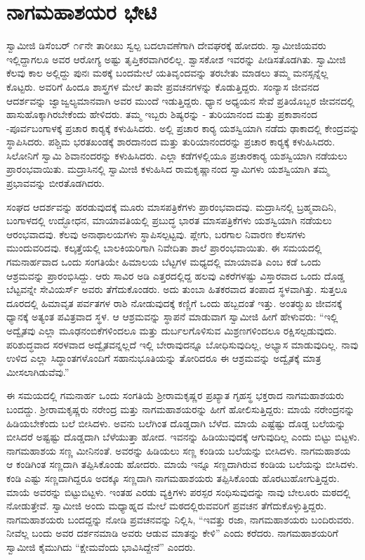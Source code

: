 
\chapter{ನಾಗಮಹಾಶಯರ ಭೇಟಿ }

 ಸ್ವಾಮೀಜಿ ಡಿಸೆಂಬರ್ ೧೯ನೇ ತಾರೀಖು ಸ್ವಲ್ಪ ಬದಲಾವಣೆಗಾಗಿ ದೇವಘರಕ್ಕೆ ಹೋದರು. ಸ್ವಾಮೀಜಿಯವರು ಇಲ್ಲಿದ್ದಾಗಲೂ ಅವರ ಆರೋಗ್ಯ ಅಷ್ಟು ತೃಪ್ತಿಕರವಾಗಿರಲಿಲ್ಲ. ಶ್ವಾಸಕೋಶ ಇವರನ್ನು ಪೀಡಿಸತೊಡಗಿತು. ಸ್ವಾಮೀಜಿ ಕೆಲವು ಕಾಲ ಅಲ್ಲಿದ್ದು ಪುನಃ ಮಠಕ್ಕೆ ಬಂದಮೇಲೆ ಯತಿವೃಂದವನ್ನು ತರಬೇತು ಮಾಡಲು ತಮ್ಮ ಮನಸ್ಸನ್ನೆಲ್ಲ ಕೊಟ್ಟರು. ಅವರಿಗೆ ಹಿಂದೂ ಶಾಸ್ತ್ರಗಳ ಮೇಲೆ ತಾವೇ ಪ್ರವಚನಗಳನ್ನು ಕೊಡುತ್ತಿದ್ದರು. ಸಂನ್ಯಾಸ ಜೀವನದ ಆದರ್ಶವನ್ನು ಜ್ವಾಜ್ವಲ್ಯಮಾನವಾಗಿ ಅವರ ಮುಂದೆ ಇಡುತ್ತಿದ್ದರು. ಧ್ಯಾನ ಅಧ್ಯಯನ ಸೇವೆ ಪ್ರತಿಯೊಬ್ಬರ ಜೀವನದಲ್ಲಿ ಹಾಸುಹೊಕ್ಕಾಗಿರಬೇಕೆಂದು ಹೇಳಿದರು. ತಮ್ಮ ಇಬ್ಬರು ಶಿಷ್ಯರನ್ನು - ತುರಿಯಾನಂದ ಮತ್ತು ಪ್ರಕಾಶಾನಂದ -ಪೂರ್ವಬಂಗಾಳಕ್ಕೆ ಪ್ರಚಾರ ಕಾರ‍್ಯಕ್ಕೆ ಕಳುಹಿಸಿದರು. ಅಲ್ಲಿ ಪ್ರಚಾರ ಕಾರ‍್ಯ ಯಶಸ್ವಿಯಾಗಿ ನಡೆದು ಢಾಕಾದಲ್ಲಿ ಕೇಂದ್ರವನ್ನು ಸ್ಥಾಪಿಸಿದರು. ಪಶ್ಚಿಮ ಭರತಖಂಡಕ್ಕೆ ಶಾರದಾನಂದ ಮತ್ತು ತುರಿಯಾನಂದರನ್ನು ಪ್ರಚಾರ ಕಾರ‍್ಯಕ್ಕೆ ಕಳುಹಿಸಿದರು. ಸಿಲೋನಿಗೆ ಸ್ವಾಮಿ ಶಿವಾನಂದರನ್ನು ಕಳುಹಿಸಿದರು. ಎಲ್ಲಾ ಕಡೆಗಳಲ್ಲಿಯೂ ಪ್ರಚಾರಕಾರ‍್ಯ ಯಶಸ್ವಿಯಾಗಿ ನಡೆಯಲು ಪ್ರಾರಂಭವಾಯಿತು. ಮದ್ರಾಸಿನಲ್ಲಿ ಸ್ವಾಮೀಜಿ ಕಳುಹಿಸಿದ ರಾಮಕೃಷ್ಣಾನಂದ ಸ್ವಾಮಿಗಳು ಯಶಸ್ವಿಯಾಗಿ ತಮ್ಮ ಪ್ರಭಾವವನ್ನು ಬೀರತೊಡಗಿದರು. 

 ಸಂಘದ ಆದರ್ಶವನ್ನು ಹರಡುವುದಕ್ಕೆ ಮೂರು ಮಾಸಪತ್ರಿಕೆಗಳು ಪ್ರಾರಂಭವಾದವು. ಮದ್ರಾಸಿನಲ್ಲಿ ಬ್ರಹ್ಮವಾದಿನಿ, ಬಂಗಾಳದಲ್ಲಿ ಉದ್ಭೋಧನ, ಮಾಯಾವತಿಯಲ್ಲಿ ಪ್ರಬುದ್ಧ ಭಾರತ ಮಾಸಪತ್ರಿಕೆಗಳು ಯಶಸ್ವಿಯಾಗಿ ನಡೆಯಲು ಆರಂಭವಾದವು. ಕೆಲವು ಅನಾಥಾಲಯಗಳು ಸ್ಥಾಪಿಸಲ್ಪಟ್ಟವು. ಪ್ಲೇಗು, ಬರಗಾಲ ನಿವಾರಣ ಕೆಲಸಗಳು ಮುಂದುವರಿದವು. ಕಲ್ಕತ್ತೆಯಲ್ಲಿ ಬಾಲಕಿಯರಿಗಾಗಿ ನಿವೇದಿತಾ ಶಾಲೆ ಪ್ರಾರಂಭವಾಯಿತು. ಈ ಸಮಯದಲ್ಲಿ ಗಮನಾರ್ಹವಾದ ಒಂದು ಸಂಗತಿಯೇ ಹಿಮಾಲಯ ಬೆಟ್ಟಗಳ ಮಧ್ಯದಲ್ಲಿ ಮಾಯಾವತಿ ಎಂಬ ಕಡೆ ಒಂದು ಆಶ್ರಮವನ್ನು ಪ್ರಾರಂಭಿಸಿದ್ದು. ಆರು ಸಾವಿರ ಅಡಿ ಎತ್ತರದಲ್ಲಿದ್ದ ಹಲವು ಎಕರೆಗಳಷ್ಟು ವಿಸ್ತಾರವಾದ ಒಂದು ದೊಡ್ಡ ಬೆಟ್ಟವನ್ನೇ ಸೇವಿಯರ್ಸ್ ಅವರು ತೆಗೆದುಕೊಂಡರು. ಅದು ತುಂಬಾ ಹಿತಕರವಾದ ತಂಪಾದ ಸ್ಥಳವಾಗಿತ್ತು. ಸುತ್ತಲೂ ದೂರದಲ್ಲಿ ಹಿಮಾವೃತ ಪರ್ವತಗಳ ರಾಶಿ ನೋಡುವುದಕ್ಕೆ ಕಣ್ಣಿಗೆ ಒಂದು ಹಬ್ಬದಂತೆ ಇತ್ತು. ಅಂತರ‍್ಮುಖ ಜೀವನಕ್ಕೆ ಧ್ಯಾನಕ್ಕೆ ಅತ್ಯಂತ ಪವಿತ್ರವಾದ ಸ್ಥಳ. ಆ ಆಶ್ರಮವನ್ನು ಸ್ಥಾಪನೆ ಮಾಡುವಾಗ ಸ್ವಾಮೀಜಿ ಹೀಗೆ ಹೇಳುವರು: “ಇಲ್ಲಿ ಅದ್ವೈತವು ಎಲ್ಲಾ ಮೂಢನಂಬಿಕೆಗಳಿಂದಲೂ ಮತ್ತು ದುರ್ಬಲಗೊಳಿಸುವ ಮಿಶ್ರಣಗಳಿಂದಲೂ ರಕ್ಷಿಸಲ್ಪಡುವುದು. ಪರಿಶುದ್ಧವಾದ ಸರಳವಾದ ಅದ್ವೈತವನ್ನಲ್ಲದೆ ಇಲ್ಲಿ ಬೇರಾವುದನ್ನೂ ಬೋಧಿಸುವುದಿಲ್ಲ, ಅಭ್ಯಾಸ ಮಾಡುವುದಿಲ್ಲ. ನಾವು ಉಳಿದ ಎಲ್ಲಾ ಸಿದ್ಧಾಂತಗಳೊಂದಿಗೆ ಸಹಾನುಭೂತಿಯನ್ನು ತೋರಿದರೂ ಈ ಆಶ್ರಮವನ್ನು ಅದ್ವೈತಕ್ಕೆ ಮಾತ್ರ ಮೀಸಲಾಗಿಡುವೆವು.” 

 ಈ ಸಮಯದಲ್ಲಿ ಗಮನಾರ್ಹ ಒಂದು ಸಂಗತಿಯೆ ಶ‍್ರೀರಾಮಕೃಷ್ಣರ ಪ್ರಖ್ಯಾತ ಗೃಹಸ್ಥ ಭಕ್ತರಾದ ನಾಗಮಹಾಶಯರು ಬಂದದ್ದು. ಶ‍್ರೀರಾಮಕೃಷ್ಣರು ನರೇಂದ್ರ ಮತ್ತು ನಾಗಮಹಾಶಯರನ್ನು ಹೀಗೆ ಹೋಲಿಸುತ್ತಿದ್ದರು: ಮಾಯೆ ನರೇಂದ್ರನನ್ನು ಹಿಡಿಯಬೇಕೆಂದು ಬಲೆ ಬೀಸಿದಳು. ಅವನು ಬಲೆಗಿಂತ ದೊಡ್ಡದಾಗಿ ಬೆಳೆದ. ಮಾಯೆ ಎಷ್ಟೆಷ್ಟು ದೊಡ್ಡ ಬಲೆಯನ್ನು ಬೀಸಿದರೆ ಅಷ್ಟಷ್ಟು ದೊಡ್ಡದಾಗಿ ಬೆಳೆಯುತ್ತಾ ಹೋದ. ಇವನನ್ನು ಹಿಡಿಯುವುದಕ್ಕೆ ಆಗುವುದಿಲ್ಲ ಎಂದು ಬಿಟ್ಟು ಬಿಟ್ಟಳು. ನಾಗಮಹಾಶಯ ಸಣ್ಣ ಮೀನಿನಂತೆ. ಅವರನ್ನು ಹಿಡಿಯಲು ಸಣ್ಣ ಕಂಡಿಯ ಬಲೆಯನ್ನು ಬೀಸಿದಳು. ನಾಗಮಹಾಶಯ ಆ ಕಂಡಿಗಿಂತ ಸಣ್ಣದಾಗಿ ತಪ್ಪಿಸಿಕೊಂಡು ಹೋದರು. ಮಾಯೆ ಇನ್ನೂ ಸಣ್ಣದಾಗಿರುವ ಕಂಡಿಯ ಬಲೆಯನ್ನು ಬೀಸಿದಳು. ಕಂಡಿ ಎಷ್ಟು ಸಣ್ಣದಾಗಿದ್ದರೂ ಅದಕ್ಕೂ ಸಣ್ಣದಾಗಿ ನಾಗಮಹಾಶಯರು ತಪ್ಪಿಸಿಕೊಂಡು ಹೊರಟುಹೋಗುತ್ತಿದ್ದರು. ಮಾಯೆ ಅವರನ್ನು ಬಿಟ್ಟುಬಿಟ್ಟಳು. ಇಂತಹ ಎರಡು ವ್ಯಕ್ತಿಗಳು ಪರಸ್ಪರ ಸಂಧಿಸುವುದನ್ನು ನಾವು ಬೇಲೂರು ಮಠದಲ್ಲಿ ನೋಡುತ್ತೇವೆ. ಸ್ವಾಮೀಜಿ ಅಂದು ಮಧ್ಯಾಹ್ನದ ಮೇಲೆ ಮಠದಲ್ಲಿರುವವರಿಗೆ ಪ್ರವಚನ ತೆಗೆದುಕೊಳ್ಳುತ್ತಿದ್ದರು. ನಾಗಮಹಾಶಯರು ಬಂದದ್ದನ್ನು ನೋಡಿ ಪ್ರವಚನವನ್ನು ನಿಲ್ಲಿಸಿ, “ಇವತ್ತು ರಜಾ, ನಾಗಮಹಾಶಯರು ಬಂದಿರುವರು. ನೀವೆಲ್ಲ ಬಂದು ಅವರ ದರ್ಶನಮಾಡಿ ಅವರು ಆಡುವ ಮಾತನ್ನು ಕೇಳಿ” ಎಂದು ಕರೆದರು. ನಾಗಮಹಾಶಯರಿಗೆ ಸ್ವಾಮೀಜಿ ಕೈಮುಗಿದು “ಕ್ಷೇಮವೆಂದು ಭಾವಿಸಿದ್ದೇನೆ” ಎಂದರು. 

